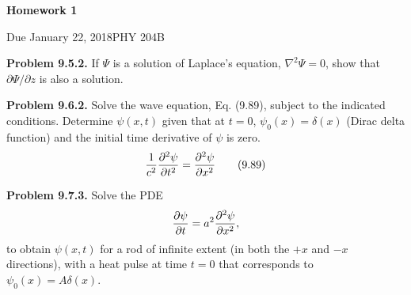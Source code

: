 \documentclass{article}
\newcommand{\Title}     {Homework 1}
\newcommand{\DueDate}   {January 22, 2018}
\newcommand{\Course}    {PHY 204B}
\begin{document}
{\huge\bf\Title}

Due \DueDate \hfill \Course


\hrulefill

\textbf{Problem 9.5.2.} If $\Psi$ is a solution of Laplace's equation, $\nabla^2\Psi = 0$, show that $\partial\Psi/\partial z$ is also a solution.

\hrulefill

\textbf{Problem 9.6.2.} Solve the wave equation, Eq. (9.89), subject to the indicated conditions. Determine $\psi(x,t)$ given that at $t=0$, $\psi_0(x) = \delta(x)$ (Dirac delta function) and the initial time derivative of $\psi$ is zero.
\begin{equation}
    \frac{1}{c^2}\pdv[2]{\psi}{t} = \pdv[2]{\psi}{x}\tag{9.89}\label{eq:9.89}
\end{equation}

\hrulefill

\textbf{Problem 9.7.3.} Solve the PDE
\begin{equation*}
\begin{aligned}
    \pdv{\psi}{t} = a^2\pdv[2]{\psi}{x},
\end{aligned}
\end{equation*}
to obtain $\psi(x,t)$ for a rod of infinite extent (in both the $+x$ and $-x$ directions), with a heat pulse at time $t = 0$ that corresponds to $\psi_0(x) = A\delta(x)$.

\hrulefill
\end{document}
